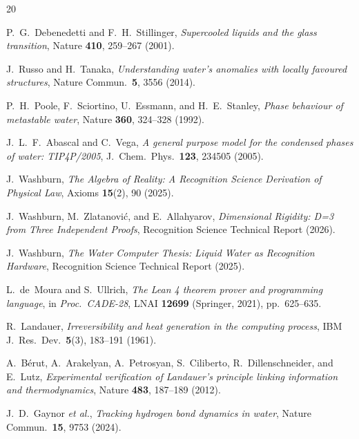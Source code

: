 \documentclass[aps,prl,twocolumn,superscriptaddress,showpacs,floatfix]{revtex4-2}
\begin{document}
\begin{thebibliography}{20}

P.~G.~Debenedetti and F.~H.~Stillinger,
\emph{Supercooled liquids and the glass transition},
Nature \textbf{410}, 259--267 (2001).

J.~Russo and H.~Tanaka,
\emph{Understanding water's anomalies with locally favoured structures},
Nature Commun.\ \textbf{5}, 3556 (2014).

P.~H.~Poole, F.~Sciortino, U.~Essmann, and H.~E.~Stanley,
\emph{Phase behaviour of metastable water},
Nature \textbf{360}, 324--328 (1992).

J.~L.~F.~Abascal and C.~Vega,
\emph{A general purpose model for the condensed phases of water: TIP4P/2005},
J.\ Chem.\ Phys.\ \textbf{123}, 234505 (2005).

J.~Washburn,
\emph{The Algebra of Reality: A Recognition Science Derivation of Physical Law},
Axioms \textbf{15}(2), 90 (2025).

J.~Washburn, M.~Zlatanovi\'{c}, and E.~Allahyarov,
\emph{Dimensional Rigidity: D=3 from Three Independent Proofs},
Recognition Science Technical Report (2026).

J.~Washburn,
\emph{The Water Computer Thesis: Liquid Water as Recognition Hardware},
Recognition Science Technical Report (2025).

L.~de~Moura and S.~Ullrich,
\emph{The Lean 4 theorem prover and programming language},
in \emph{Proc.\ CADE-28}, LNAI \textbf{12699} (Springer, 2021), pp.~625--635.

R.~Landauer,
\emph{Irreversibility and heat generation in the computing process},
IBM J.\ Res.\ Dev.\ \textbf{5}(3), 183--191 (1961).

A.~B\'{e}rut, A.~Arakelyan, A.~Petrosyan, S.~Ciliberto, R.~Dillenschneider, and E.~Lutz,
\emph{Experimental verification of Landauer's principle linking information and thermodynamics},
Nature \textbf{483}, 187--189 (2012).

J.~D.~Gaynor \emph{et al.},
\emph{Tracking hydrogen bond dynamics in water},
Nature Commun.\ \textbf{15}, 9753 (2024).

\end{thebibliography}
\end{document}
